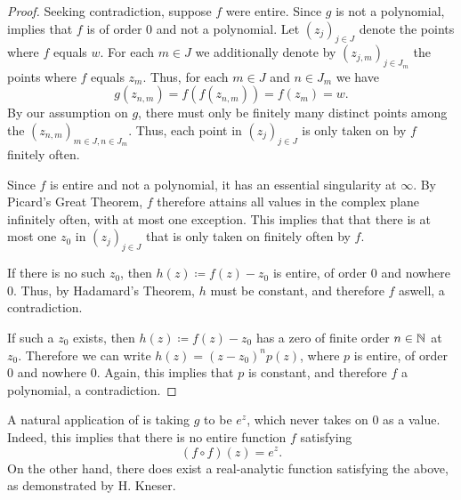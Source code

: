 \begin{proof}
    Seeking contradiction, suppose $f$ were entire. Since $g$ is not a polynomial,  implies that $f$ is of order $0$ and not a polynomial. Let $(z_j)_{j \in J}$ denote the points where $f$ equals $w$. For each $m \in J$ we additionally denote by $(z_{j,m})_{j \in J_m}$ the points where $f$ equals $z_m$. Thus, for each $m \in J$ and $n \in J_m$ we have
    $$ g(z_{n,m}) = f(f(z_{n,m})) = f(z_m) = w. $$
    By our assumption on $g$, there must only be finitely many distinct points among the $(z_{n,m})_{m \in J,n \in J_m}$. Thus, each point in $(z_j)_{j \in J}$ is only taken on by $f$ finitely often.


    Since $f$ is entire and not a polynomial, it has an essential singularity at $\infty$. By Picard's Great Theorem, $f$ therefore attains all values in the complex plane infinitely often, with at most one exception. This implies that that there is at most one $z_0$ in $(z_j)_{j \in J}$ that is only taken on finitely often by $f$.

    If there is no such $z_0$, then $h(z) \coloneqq f(z) - z_0$ is entire, of order $0$ and nowhere $0$. Thus, by Hadamard's Theorem, $h$ must be constant, and therefore $f$ aswell, a contradiction.

    If such a $z_0$ exists, then $h(z) \coloneqq f(z) - z_0$ has a zero of finite order $n \in \mathbb{N}$ at $z_0$. Therefore we can write $h(z) = (z - z_0)^n p(z)$, where $p$ is entire, of order $0$ and nowhere $0$. Again, this implies that $p$ is constant, and therefore $f$ a polynomial, a contradiction.
\end{proof}

\begin{example}
    A natural application of  is taking $g$ to be $e^z$, which never takes on $0$ as a value. Indeed, this implies that there is no entire function $f$ satisfying
    $$ (f \circ f)(z) = e^z. $$
    On the other hand, there does exist a real-analytic function satisfying the above, as demonstrated by H. Kneser. 
\end{example}